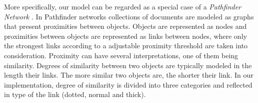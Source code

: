 More specifically, our model can be regarded as a special case of a \emph{Pathfinder Network} \cite{schvaneveldt1990pathfinder}.
In Pathfinder networks collections of documents are modeled as graphs that present proximities between objects. 
Objects are represented as nodes and proximities between objects are represented as links between nodes, where only the strongest links according to a adjustable proximity threshold are taken into consideration. Proximity can have several interpretations, one of them being similarity.
Degrees of similarity between two objects are typically modeled in the length their links. The more similar two objects are, the shorter their link.
In our implementation, degree of similarity is divided into three categories and reflected in type of the link (dotted, normal and thick). 